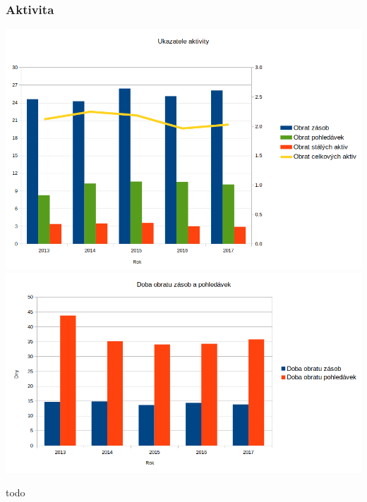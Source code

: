 \documentclass[12pt]{article}%
\begin{document}
\subsubsection*{Aktivita}
\includegraphics[scale=0.6]{obr/ukazatele_aktivity.png} \\
\includegraphics[scale=0.6]{obr/doba_obratu.png}




todo


\def\bsl{\char92}
\def\lsv{\char123}
\def\rsv{\char125}




\end{document}
